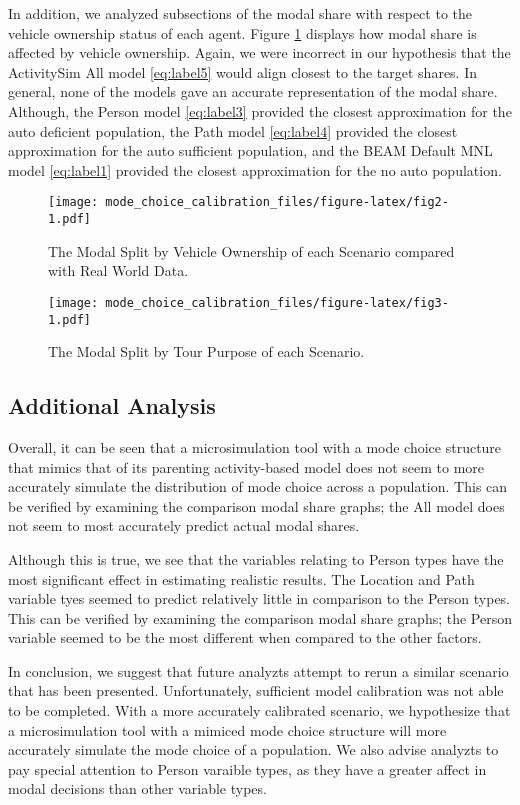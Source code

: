 \documentclass[3p, authoryear]{elsarticle} %
\begin{document}
In addition, we analyzed subsections of the modal share with respect to the vehicle ownership status of each agent. Figure \ref{fig:fig2} displays how modal share is affected by vehicle ownership. Again, we were incorrect in our hypothesis that the ActivitySim All model \eqref{eq:label5} would align closest to the target shares. In general, none of the models gave an accurate representation of the modal share. Although, the Person model \eqref{eq:label3} provided the closest approximation for the auto deficient population, the Path model \eqref{eq:label4} provided the closest approximation for the auto sufficient population, and the BEAM Default MNL model \eqref{eq:label1} provided the closest approximation for the no auto population.

\begin{figure}
\centering
\texttt{[image: mode\_choice\_calibration\_files/figure-latex/fig2-1.pdf]}
\caption{\label{fig:fig2}The Modal Split by Vehicle Ownership of each Scenario compared with Real World Data.}
\end{figure}

\begin{figure}
\centering
\texttt{[image: mode\_choice\_calibration\_files/figure-latex/fig3-1.pdf]}
\caption{\label{fig:fig3}The Modal Split by Tour Purpose of each Scenario.}
\end{figure}

\hypertarget{additional-analysis}{%
\subsection{Additional Analysis}\label{additional-analysis}}

Overall, it can be seen that a microsimulation tool with a mode choice structure that mimics that of its parenting activity-based model does not seem to more accurately simulate the distribution of mode choice across a population. This can be verified by examining the comparison modal share graphs; the All model does not seem to most accurately predict actual modal shares.

Although this is true, we see that the variables relating to Person types have the most significant effect in estimating realistic results. The Location and Path variable tyes seemed to predict relatively little in comparison to the Person types. This can be verified by examining the comparison modal share graphs; the Person variable seemed to be the most different when compared to the other factors.

In conclusion, we suggest that future analyzts attempt to rerun a similar scenario that has been presented. Unfortunately, sufficient model calibration was not able to be completed. With a more accurately calibrated scenario, we hypothesize that a microsimulation tool with a mimiced mode choice structure will more accurately simulate the mode choice of a population. We also advise analyzts to pay special attention to Person varaible types, as they have a greater affect in modal decisions than other variable types.


\end{document}
